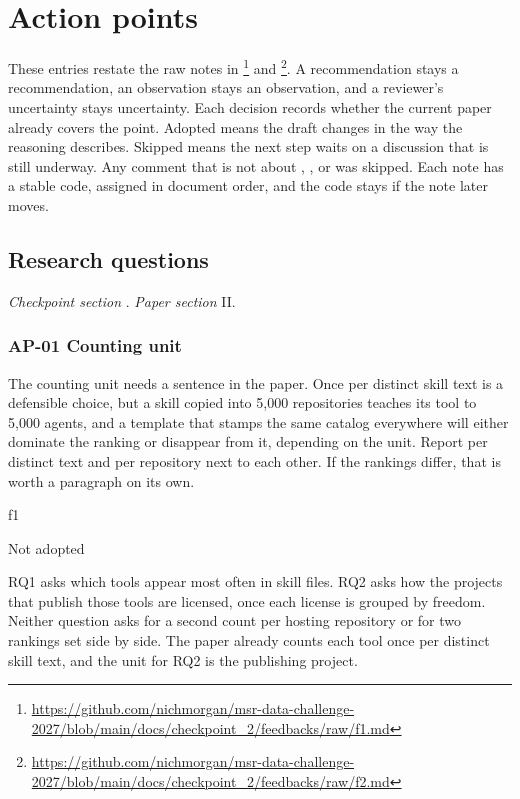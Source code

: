 \section{Action points}
\label{sec:action-points}

These entries restate the raw notes in \footnote{\url{https://github.com/nichmorgan/msr-data-challenge-2027/blob/main/docs/checkpoint_2/feedbacks/raw/f1.md}} and \footnote{\url{https://github.com/nichmorgan/msr-data-challenge-2027/blob/main/docs/checkpoint_2/feedbacks/raw/f2.md}}.
A recommendation stays a recommendation, an observation stays an observation, and a reviewer’s uncertainty stays uncertainty.
Each decision records whether the current paper already covers the point.
Adopted means the draft changes in the way the reasoning describes.
Skipped means the next step waits on a discussion that is still underway.
Any comment that is not about , , or  was skipped.
Each note has a stable code, assigned in document order, and the code stays if the note later moves.

\subsection*{Research questions}

\textit{Checkpoint section} . \textit{Paper section} II.

\subsubsection*{AP-01 Counting unit}
\label{ap:01}

\begin{description}[leftmargin=0pt]
  \item[Point] The counting unit needs a sentence in the paper. Once per distinct skill text is a defensible choice, but a skill copied into 5,000 repositories teaches its tool to 5,000 agents, and a template that stamps the same catalog everywhere will either dominate the ranking or disappear from it, depending on the unit. Report per distinct text and per repository next to each other. If the rankings differ, that is worth a paragraph on its own.
  \item[Source] f1
  \item[Decision] Not adopted
  \item[Reasoning] RQ1 asks which tools appear most often in skill files. RQ2 asks how the projects that publish those tools are licensed, once each license is grouped by freedom. Neither question asks for a second count per hosting repository or for two rankings set side by side. The paper already counts each tool once per distinct skill text, and the unit for RQ2 is the publishing project.
\end{description}


